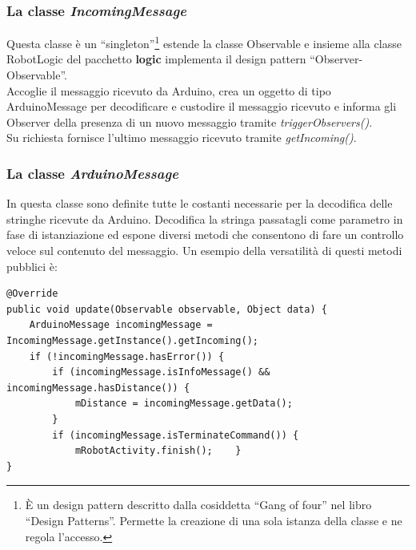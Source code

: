 \subsubsection{La classe \emph{IncomingMessage}}
Questa classe è un ``singleton''\footnote{È un design pattern descritto dalla 
cosiddetta ``Gang of four'' nel libro ``Design Patterns''. 
Permette la creazione di una sola istanza della classe e ne regola l'accesso.} 
estende la classe Observable e insieme alla classe RobotLogic del 
pacchetto \textbf{logic} implementa il design pattern ``Observer-Observable''. 
\\Accoglie il messaggio ricevuto da Arduino, crea un oggetto di tipo ArduinoMessage 
per decodificare e custodire il messaggio ricevuto e informa gli Observer della presenza 
di un nuovo messaggio tramite \emph{triggerObservers()}.\\
Su richiesta fornisce l'ultimo messaggio ricevuto tramite \emph{getIncoming()}.

\subsubsection{La classe \emph{ArduinoMessage}}
In questa classe sono definite tutte le costanti necessarie per la 
decodifica delle stringhe ricevute da Arduino. 
Decodifica la stringa passatagli come parametro in fase di istanziazione ed 
espone diversi metodi che consentono di fare un controllo veloce sul contenuto del messaggio.
Un esempio della versatilità di questi metodi pubblici è:  
\lstset{language=Java}

\begin{lstlisting}[caption=Metodo \emph{update()} di RobotLogic del 
pacchetto \textbf{logic}]
@Override
public void update(Observable observable, Object data) {
    ArduinoMessage incomingMessage = IncomingMessage.getInstance().getIncoming();
    if (!incomingMessage.hasError()) {
        if (incomingMessage.isInfoMessage() && incomingMessage.hasDistance()) {
            mDistance = incomingMessage.getData();
        }
        if (incomingMessage.isTerminateCommand()) {
            mRobotActivity.finish();    }
}
\end{lstlisting}

